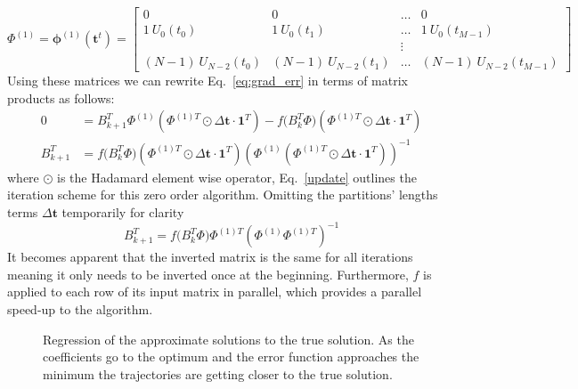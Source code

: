 \documentclass[11pt]{report}
\begin{document}
    \begin{equation*}
        \label{DPHI}
        {\Phi}^{(1)} = \pmb{\phi}^{(1)}(\pmb{t}^t) =
        \begin{bmatrix}
            0                     & 0                     & \dots & 0                         \\
            1 \: U_0(t_0)         & 1 \: U_0(t_1)         & \dots & 1 \: U_0(t_{M-1})         \\
            & & \vdots \\
            (N-1) \: U_{N-2}(t_0) & (N-1) \: U_{N-2}(t_1) & \dots & (N-1) \: U_{N-2}(t_{M-1})
        \end{bmatrix}
    \end{equation*}
    Using these matrices we can rewrite Eq.~\ref{eq:grad_err} in terms of matrix products as follows:
    \begin{align}
        0 &=
        B_{k+1}^T \Phi^{(1)} (\Phi^{(1)T} \odot \Delta \pmb{t} \cdot \pmb{1}^T  ) -
        f \big( B_{k}^T  \Phi \big) ({\Phi}^{(1)T} \odot \Delta \pmb{t} \cdot \pmb{1}^T )
        \\
        B_{k+1}^T &=
        f \big( B_{k}^T \Phi \big) ( {\Phi}^{(1)T} \odot \Delta \pmb{t} \cdot \pmb{1}^T)
        ( \Phi^{(1)} (\Phi^{(1)T} \odot \Delta \pmb{t} \cdot \pmb{1}^T ) )^{-1} \label{update}
    \end{align}
    where $\odot$ is the Hadamard element wise operator, Eq.~\eqref{update} outlines the iteration scheme for this zero order algorithm.
    Omitting the partitions' lengths terms $\Delta \pmb{t}$ temporarily for clarity
    \begin{equation}
        \label{eq:biter}
        B_{k+1}^T =
        f \big( B_{k}^T \Phi \big) {\Phi}^{(1)T}
        ( \Phi^{(1)} \Phi^{(1)T} )^{-1}
    \end{equation}
    It becomes apparent that the inverted matrix is the same for all iterations meaning it only needs to be inverted
    once at the beginning.
    Furthermore, $f$ is applied to each row of its input matrix in parallel, which provides a parallel speed-up to
    the algorithm.
    \begin{figure}[H]
        \begin{center}
            
        \end{center}
        \caption{ Regression of the approximate solutions to the true solution. As the coefficients go to the
        optimum and the error function approaches the minimum the trajectories are getting closer to the true solution.}
        \label{fig:reg_sol}
    \end{figure}
\end{document}
